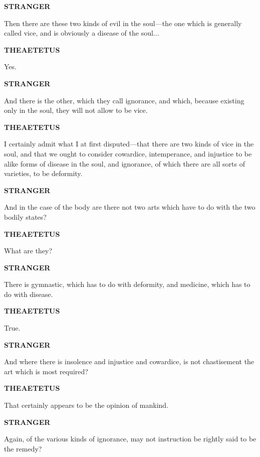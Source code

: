 \documentclass[11pt,letter]{article}
\begin{document}
\par \textbf{STRANGER}
\par   Then there are these two kinds of evil in the soul—the one which is generally called vice, and is obviously a disease of the soul...

\par \textbf{THEAETETUS}
\par   Yes.

\par \textbf{STRANGER}
\par   And there is the other, which they call ignorance, and which, because existing only in the soul, they will not allow to be vice.

\par \textbf{THEAETETUS}
\par   I certainly admit what I at first disputed—that there are two kinds of vice in the soul, and that we ought to consider cowardice, intemperance, and injustice to be alike forms of disease in the soul, and ignorance, of which there are all sorts of varieties, to be deformity.

\par \textbf{STRANGER}
\par   And in the case of the body are there not two arts which have to do with the two bodily states?

\par \textbf{THEAETETUS}
\par   What are they?

\par \textbf{STRANGER}
\par   There is gymnastic, which has to do with deformity, and medicine, which has to do with disease.

\par \textbf{THEAETETUS}
\par   True.

\par \textbf{STRANGER}
\par   And where there is insolence and injustice and cowardice, is not chastisement the art which is most required?

\par \textbf{THEAETETUS}
\par   That certainly appears to be the opinion of mankind.

\par \textbf{STRANGER}
\par   Again, of the various kinds of ignorance, may not instruction be rightly said to be the remedy?
\end{document}
